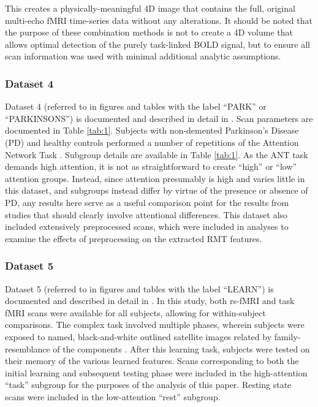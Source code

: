 \documentclass[10pt]{article}
\begin{document}
This creates a physically-meaningful 4D image that contains the full, original multi-echo fMRI
time-series data without any alterations. It should be noted that the purpose of these combination
methods is not to create a 4D volume that allows optimal detection of the purely task-linked BOLD
signal, but to ensure all scan information was used with minimal additional analytic assumptions.

\subsubsection{Dataset 4}
Dataset 4 (referred to in figures and tables with the label ``PARK'' or ``PARKINSONS'') is documented and
described in detail in \cite{madhyasthaDynamicConnectivityRest2015}. Scan parameters are documented
in Table \ref{tab:1}. Subjects with non-demented Parkinson’s Disease (PD) and healthy controls performed a
number of repetitions of the Attention Network Task
\citep[ANT;][]{fanActivationAttentionalNetworks2005}. Subgroup details are available in Table \ref{tab:1}. As the ANT
task demands high attention, it is not as straightforward to create ``high'' or ``low'' attention
groups. Instead, since attention presumably is high and varies little in this dataset, and subgroups
instead differ by virtue of the presence or absence of PD, any results here serve as a useful
comparison point for the results from studies that should clearly involve attentional differences.
This dataset also included extensively preprocessed scans, which were included in analyses to
examine the effects of preprocessing on the extracted RMT features.

\subsubsection{Dataset 5}
Dataset 5 (referred to in figures and tables with the label ``LEARN'') is documented and described in
detail in \cite{schapiroHumanHippocampalReplay2018}. In this study, both rs-fMRI and task fMRI scans
were available for all subjects, allowing for within-subject comparisons. The complex task involved
multiple phases, wherein subjects were exposed to named, black-and-white outlined satellite images
related by family-resemblance of the components \citep[see figure 1
of][]{schapiroHumanHippocampalReplay2018}. After this learning task, subjects were tested on their
memory of the various learned features. Scans corresponding to both the initial learning and
subsequent testing phase were included in the high-attention ``task'' subgroup for the purposes of
the analysis of this paper. Resting state scans were included in the low-attention ``rest''
subgroup.
\end{document}
